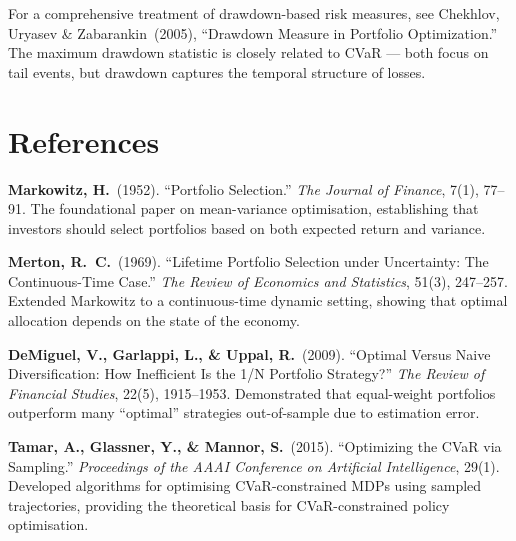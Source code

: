 \documentclass[11pt, a4paper]{article}
\theoremstyle{definition}
\theoremstyle{plain}
\theoremstyle{remark}
\begin{document}
\begin{refbox}
For a comprehensive treatment of drawdown-based risk measures, see
Chekhlov, Uryasev \& Zabarankin~(2005), ``Drawdown Measure in Portfolio
Optimization.'' The maximum drawdown statistic is closely related to CVaR
--- both focus on tail events, but drawdown captures the temporal structure
of losses.
\end{refbox}


\section{References}
\label{sec:references}

\begin{enumerate}[leftmargin=2em, label={[\arabic*]}]

    \item \textbf{Markowitz, H.}~(1952).
          ``Portfolio Selection.''
          \emph{The Journal of Finance}, 7(1), 77--91.
          The foundational paper on mean-variance optimisation, establishing
          that investors should select portfolios based on both expected
          return and variance.

    \item \textbf{Merton, R.~C.}~(1969).
          ``Lifetime Portfolio Selection under Uncertainty: The
          Continuous-Time Case.''
          \emph{The Review of Economics and Statistics}, 51(3), 247--257.
          Extended Markowitz to a continuous-time dynamic setting, showing
          that optimal allocation depends on the state of the economy.

    \item \textbf{DeMiguel, V., Garlappi, L., \& Uppal, R.}~(2009).
          ``Optimal Versus Naive Diversification: How Inefficient Is the
          1/N Portfolio Strategy?''
          \emph{The Review of Financial Studies}, 22(5), 1915--1953.
          Demonstrated that equal-weight portfolios outperform many
          ``optimal'' strategies out-of-sample due to estimation error.

    \item \textbf{Tamar, A., Glassner, Y., \& Mannor, S.}~(2015).
          ``Optimizing the CVaR via Sampling.''
          \emph{Proceedings of the AAAI Conference on Artificial Intelligence},
          29(1).
          Developed algorithms for optimising CVaR-constrained MDPs using
          sampled trajectories, providing the theoretical basis for
          CVaR-constrained policy optimisation.


\end{enumerate}
\end{document}
